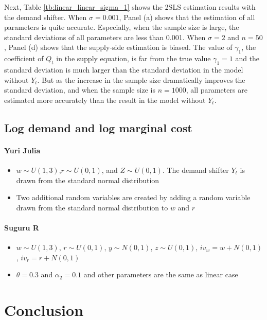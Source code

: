 \documentclass[11pt, a4paper]{article}
\begin{document}
Next, Table \ref{tb:linear_linear_sigma_1} shows the 2SLS estimation results with the demand shifter.
When $\sigma = 0.001$, Panel (a) shows that the estimation of all parameters is quite accurate.
Especially, when the sample size is large, the standard deviations of all parameters are less than 0.001.
When $\sigma = 2$ and $n = 50$, Panel (d) shows that the supply-side estimation is biased.
The value of $\gamma_1$, the coefficient  of $Q_t$ in the supply equation, is far from the true value $\gamma_1 = 1$ and the standard deviation is much larger than the standard deviation in the model without $Y_t$.
But as the increase in the sample size dramatically improves the standard deviation, and when the sample size is $n = 1000$, all parameters are estimated more accurately than the result in the model without $Y_t$.





\subsection{Log demand and log marginal cost}


\paragraph{Yuri Julia}
\begin{itemize}
    \item $w \sim U(1,3)$,$r \sim U(0,1)$, and $Z \sim U(0, 1)$. The demand shifter $Y_t$ is drawn from the standard normal distribution
    \item Two additional random variables are created by adding a random variable drawn from the standard normal distribution to $w$ and $r$
\end{itemize}



\paragraph{Suguru R}
\begin{itemize}
    \item $w\sim U(1,3) $, $r\sim U(0,1) $, $y\sim N(0,1) $, $z\sim U(0,1) $, $iv_{w}=w+N(0,1) $, $iv_{r}=r+N(0,1) $
    \item $\theta=0.3$ and $\alpha_2=0.1$ and other parameters are the same as linear case
\end{itemize}



    
\section{Conclusion}
\end{document}
